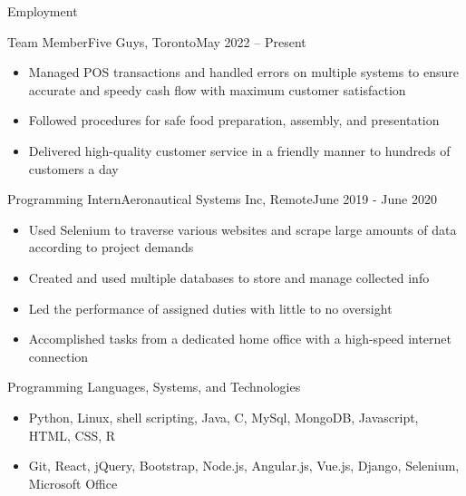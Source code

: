 \documentclass[]{mcdowellcv}
\begin{document}
	\begin{cvsection}{Employment}
		\begin{cvsubsection}{Team Member}{Five Guys, Toronto}{May 2022 – Present}
			\begin{itemize}
                    \item Managed POS transactions and handled errors on multiple systems to ensure accurate and 
			    speedy cash flow with maximum customer satisfaction
		    \item Followed procedures for safe food preparation, assembly, and presentation
                    \item Delivered high-quality customer service in a friendly manner to hundreds of customers a day
			\end{itemize}
		\end{cvsubsection}
		
		\begin{cvsubsection}{Programming Intern}{Aeronautical Systems Inc, Remote}{June 2019 - June 2020}	
			\begin{itemize}
				\item Used Selenium to traverse various websites and scrape large amounts of  
				data according to project demands
				\item Created and used multiple databases to store and manage collected info
				\item Led the performance of assigned duties with little to no oversight
				\item Accomplished tasks from a dedicated home office with a high-speed internet connection
			\end{itemize}
		\end{cvsubsection}

	\end{cvsection}

\begin{cvsection}{Programming Languages, Systems, and Technologies}
		\begin{cvsubsection}{}{}{}	
			\begin{itemize}
                    \item Python, Linux, shell scripting, Java, C, MySql, MongoDB, Javascript, HTML, CSS, R
                    \item Git, React, jQuery, Bootstrap, Node.js, Angular.js, Vue.js, Django, Selenium, 
			    Microsoft Office
			\end{itemize}
		\end{cvsubsection}
	\end{cvsection}
\end{document}
